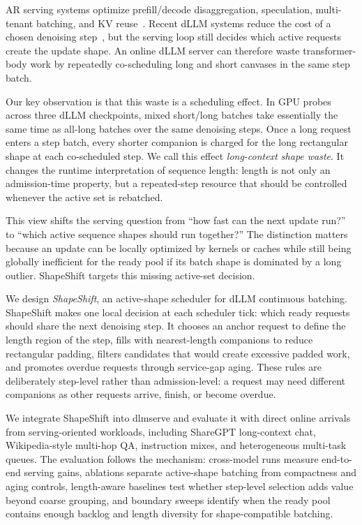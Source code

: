 \documentclass[a4paper]{llncs}
\begin{document}
AR serving systems optimize prefill/decode disaggregation, speculation, multi-tenant batching, and KV reuse~\cite{splitwise2023,specinfer2024,medusa2024,eagle2024,tetriinfer2024,punica2023,slora2023,muxserve2024,loongserve2024,alignedserve2026,laps2026,mcam2025}. Recent dLLM systems reduce the cost of a chosen denoising step~\cite{zhao2025fastdllm,dInfer2025,dllmserve2025}, but the serving loop still decides which active requests create the update shape. An online dLLM server can therefore waste transformer-body work by repeatedly co-scheduling long and short canvases in the same step batch.

Our key observation is that this waste is a scheduling effect. In GPU probes across three dLLM checkpoints, mixed short/long batches take essentially the same time as all-long batches over the same denoising steps. Once a long request enters a step batch, every shorter companion is charged for the long rectangular shape at each co-scheduled step. We call this effect \emph{long-context shape waste}. It changes the runtime interpretation of sequence length: length is not only an admission-time property, but a repeated-step resource that should be controlled whenever the active set is rebatched.

This view shifts the serving question from ``how fast can the next update run?'' to ``which active sequence shapes should run together?'' The distinction matters because an update can be locally optimized by kernels or caches while still being globally inefficient for the ready pool if its batch shape is dominated by a long outlier. ShapeShift targets this missing active-set decision.

We design \emph{ShapeShift}, an active-shape scheduler for dLLM continuous batching. ShapeShift makes one local decision at each scheduler tick: which ready requests should share the next denoising step. It chooses an anchor request to define the length region of the step, fills with nearest-length companions to reduce rectangular padding, filters candidates that would create excessive padded work, and promotes overdue requests through service-gap aging. These rules are deliberately step-level rather than admission-level: a request may need different companions as other requests arrive, finish, or become overdue.

We integrate ShapeShift into dlmserve and evaluate it with direct online arrivals from serving-oriented workloads, including ShareGPT long-context chat, Wikipedia-style multi-hop QA, instruction mixes, and heterogeneous multi-task queues. The evaluation follows the mechanism: cross-model runs measure end-to-end serving gains, ablations separate active-shape batching from compactness and aging controls, length-aware baselines test whether step-level selection adds value beyond coarse grouping, and boundary sweeps identify when the ready pool contains enough backlog and length diversity for shape-compatible batching.
\end{document}
